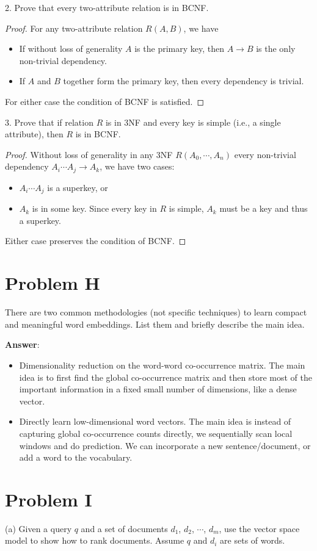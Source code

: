 \documentclass{article}
\begin{document}
2. Prove that every two-attribute relation is in BCNF.
\begin{proof}
For any two-attribute relation $R(A, B)$, we have
\begin{itemize}
\item If without loss of generality $A$ is the primary key, then $A \to B$ is the only non-trivial dependency. 
\item If $A$ and $B$ together form the primary key, then every dependency is trivial.
\end{itemize}
For either case the condition of BCNF is satisfied.
\end{proof}

3. Prove that if relation $R$ is in 3NF and every key is simple (i.e., a single attribute), then $R$ is in BCNF.
\begin{proof}
Without loss of generality in any 3NF $R(A_0, \cdots, A_n)$ every non-trivial dependency $A_i \cdots A_j \to A_k$, we have two cases:
\begin{itemize}
\item $A_i \cdots A_j$ is a superkey, or
\item $A_k$ is in some key. Since every key in $R$ is simple, $A_k$ must be a key and thus a superkey.
\end{itemize}
Either case preserves the condition of BCNF.
\end{proof}

\section{Problem H}
There are two common methodologies (not specific techniques) to learn compact and meaningful word embeddings. List them and briefly describe the main idea.

{\bf Answer}:
\begin{itemize}
\item Dimensionality reduction on the word-word co-occurrence matrix. The main idea is to first find the global co-occurrence matrix and then store most of the important information in a fixed small number of dimensions, like a dense vector.
\item Directly learn low-dimensional word vectors. The main idea is instead of capturing global co-occurrence counts directly, we sequentially scan local windows and do prediction. We can incorporate a new sentence/document, or add a word to the vocabulary.
\end{itemize}

\section{Problem I}
(a) Given a query $q$ and a set of documents $d_1$, $d_2$, $\cdots$, $d_m$, use the vector space model to show how to rank documents. Assume $q$ and $d_i$ are sets of words.
\end{document}
